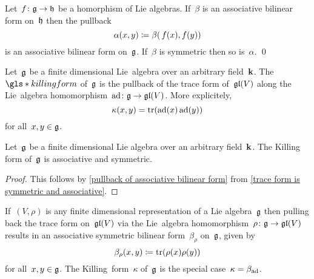 \begin{lemma}
  \label{pullback of associative bilinear form}
  Let~$f \colon \mathfrak{g} \to \mathfrak{h}$ be a homorphism of Lie algebras.
  If~$\beta$ is an associative bilinear form on~$\mathfrak{h}$ then the pullback
  \[
    \alpha(x,y)
    \coloneqq
    \beta(\, f(x), f(y))
  \]
  is an associative bilinear form on~$\mathfrak{g}$.
  If~$\beta$ is symmetric then so is~$\alpha$.
  \qed
\end{lemma}


\begin{definition}
  \label{killing form}
  Let~$\mathfrak{g}$ be a finite dimensional Lie~algebra over an arbitrary field~$\mathbf{k}$.
  The ~$\gls*{killing form}$ of~$\mathfrak{g}$ is the pullback of the trace form of~$\mathfrak{gl}(V)$ along the Lie~algebra homomorphism~$\operatorname{ad} \colon \mathfrak{g} \to \mathfrak{gl}(V)$.
  More explicitely,
  \[
    \kappa(x,y)
    =
    \operatorname{tr}(\operatorname{ad}(x) \operatorname{ad}(y))
  \]
  for all~$x, y \in \mathfrak{g}$.
\end{definition}


\begin{lemma}
  \label{killing form is associative and symmetric}
  Let~$\mathfrak{g}$ be a finite dimensional Lie algebra over an arbitrary field~$\mathbf{k}$.
  The Killing form of~$\mathfrak{g}$ is associative and symmetric.
\end{lemma}


\begin{proof}
  This follows by \cref{pullback of associative bilinear form} from \cref{trace form is symmetric and associative}.
\end{proof}


\begin{remark}
  \label{associative bilinear form of a representation}
  If~$(V,\rho)$ is any finite dimensional representation of a Lie algebra~$\mathfrak{g}$ then pulling back the trace form on~$\mathfrak{gl}(V)$ via the Lie~algebra homomorphism~$\rho \colon \mathfrak{g} \to \mathfrak{gl}(V)$ results in an associative symmetric bilinear form~$\beta_\rho$ on~$\mathfrak{g}$, given by
  \[
    \beta_\rho(x,y)
    \coloneqq
    \operatorname{tr}(\rho(x) \rho(y))
  \]
  for all~$x, y \in \mathfrak{g}$.
  The Killing~form~$\kappa$ of~$\mathfrak{g}$ is the special case~$\kappa = \beta_{\operatorname{ad}}$.
\end{remark}


